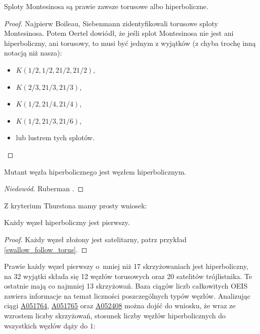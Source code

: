\begin{proposition}
%
    Sploty Montesinosa są prawie zawsze torusowe albo hiperboliczne.
\end{proposition}

\begin{proof}
    Najpierw Boileau, Siebenmann \cite{boileau1980} zidentyfikowali torusowe sploty Montesinosa.
    Potem Oertel \cite{oertel1984} dowiódł, że jeśli splot Montesinosa nie jest ani hiperboliczny, ani torusowy, to musi być jednym z wyjątków (z chyba trochę inną notacją niż nasza):
    \begin{itemize}
        \item $K(1/2, 1/2, 21/2, 21/2)$,
        \item $K(2/3, 21/3, 21/3)$,
        \item $K(1/2, 21/4, 21/4)$,
        \item $K(1/2, 21/3, 21/6)$,
        \item lub lustrem tych splotów. \qedhere
    \end{itemize}
\end{proof}

\begin{proposition}
    Mutant węzła hiperbolicznego jest węzłem hiperbolicznym.
\end{proposition}

\begin{proof}[Niedowód]
%
    Ruberman \cite[wniosek 1.4]{ruberman1987}.
\end{proof}

Z kryterium Thurstona mamy prosty wniosek:

\begin{corollary}
    Każdy węzeł hiperboliczny jest pierwszy.
\end{corollary}

\begin{proof}
    Każdy węzeł złożony jest satelitarny, patrz przykład \ref{swallow_follow_torus}.
\end{proof}

Prawie każdy węzeł pierwszy o~mniej niż 17 skrzyżowaniach jest hiperboliczny, na 32 wyjątki składa się 12 węzłów torusowych oraz 20 satelitów trójlistnika.
\label{page:nonhyperbolic_below_16}%
Te ostatnie mają co najmniej 13 skrzyżowań.
Baza ciągów liczb całkowitych OEIS zawiera informacje na temat liczności poszczególnych typów węzłów.
Analizując ciągi \href{https://oeis.org/A051764}{A051764}, \href{https://oeis.org/A051765}{A051765} oraz \href{https://oeis.org/A052408}{A052408} można dojść do wniosku, że wraz ze wzrostem liczby skrzyżowań, stosunek liczby węzłów hiperbolicznych do wszystkich węzłów dąży do $1$:

